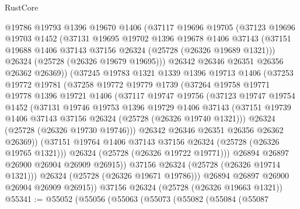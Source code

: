 \begin{lexlean}{RustCore}
\begin{coremodule}
          @19786
          @19793
          @1396
          @19670
          @1406
          (@37117
            @19696
            @19705
            (@37123
              @19696
              @19703
              @1452
              (@37131
                @19695
                @19702
                @1396
                @19678
                @1406
                @37143
                (@37151 @19688 @1406 @37143 @37156 @26324 (@25728 (@26326 @19689 @1321)))
                @26324
                (@25728 (@26326 @19679 @19695)))
              @26342
              @26346
              @26351
              @26356
              @26362
              @26369))
          (@37245
            @19783
            @1321
            @1339
            @1396
            @19713
            @1406
            (@37253
              @19772
              @19781
              (@37258
                @19772
                @19779
                @1739
                (@37264
                  @19758
                  @19771
                  @19778
                  @1396
                  @19721
                  @1406
                  (@37117
                    @19747
                    @19756
                    (@37123
                      @19747
                      @19754
                      @1452
                      (@37131
                        @19746
                        @19753
                        @1396
                        @19729
                        @1406
                        @37143
                        (@37151 @19739 @1406 @37143 @37156 @26324 (@25728 (@26326 @19740 @1321)))
                        @26324
                        (@25728 (@26326 @19730 @19746)))
                      @26342
                      @26346
                      @26351
                      @26356
                      @26362
                      @26369))
                  (@37151 @19764 @1406 @37143 @37156 @26324 (@25728 (@26326 @19765 @1321)))
                  @26324
                  (@25728 (@26326 @19722 @19771)))
                @26894
                @26897
                @26900
                @26904
                @26909
                @26915))
            @37156
            @26324
            (@25728 (@26326 @19714 @1321)))
          @26324
          (@25728 (@26326 @19671 @19786)))
        @26894
        @26897
        @26900
        @26904
        @26909
        @26915))
    @37156
    @26324
    (@25728 (@26326 @19663 @1321))
@55341 := @55052
    (@55056
      (@55063
        (@55073
          (@55082
            (@55084
              (@55087

\end{coremodule}
\end{lexlean}
